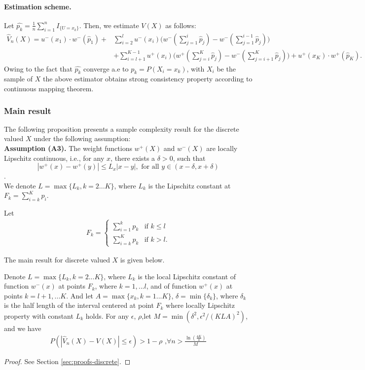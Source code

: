 \paragraph{Estimation scheme.} 
Let $\hat{p_k}= \frac{1}{n} \sum_{i=1}^n I_{\{U =x_k\}}$. Then, we estimate $V(X)$ as follows:
\begin{align}
 \label{eq:cpt-discrete-est}
\hat V_n(X) = 
u^-(x_1)\cdot w^-(\hat p_1)+
& \sum_{i=2}^l u^-(x_i) \Big(w^-(\sum_{j=1}^i \hat p_j) - w^-(\sum_{j=1}^{i-1} \hat p_j)\Big) 
\\
&
+ \sum_{i=l+1}^{K-1} u^+(x_i) \Big(w^+(\sum_{j=i}^K \hat p_j) - w^-(\sum_{j=i+1}^K \hat p_j) \Big)+ u^+(x_K)\cdot w^+(\hat p_K).
\end{align}
Owing to the fact that $\hat{p_k}$ converge a.e to $p_k=P(X_i=x_k)$, with $X_i$ be the sample of $X$ the above estimator obtains strong consistency property according to continuous mapping theorem. 


\subsubsection*{Main result}
The following proposition presents a sample complexity result for the discrete valued $X$ under the following assumption:\\
\textbf{Assumption (A3).}  The weight functions $w^+(X)$ and $w^-(X)$ are locally Lipschitz continuous, i.e., for any $x$, there exists a $\delta>0$, such that
$$| w^+(x) - w^+(y) | \leq L_x |x-y|, \text{ for all } y \in (x-\delta,x+\delta) $$.\\

We denote $L=\max\{L_k, k=2...K\}$,  where $L_k$ is the Lipschitz constant at $F_k = \sum_{i=k}^K p_i$.


Let 
\begin{align}
\label{eq:Fk}
F_k = 
\begin{cases}
   \sum_{i=1}^k p_k & \text{if   } k \leq l \\
   \sum_{i=k}^K p_k & \text{if  }  k > l.
\end{cases}  
\end{align}

The main result for discrete valued $X$ is given below.
\begin{proposition}
\label{prop:sample-complexity-discrete}
Denote $L=\max\{L_k, k=2...K\} $, where $L_k$ is the local Lipschitz constant of function $w^-(x)$ at points
$F_k$, where $k=1,...l$, and of function $w^+(x)$ at points $k=l+1,...K$. 
And let $A=\max\{x_k, k=1...K\}$, $\delta =\min\{\delta_k\}$, where $\delta_k$ is the half length of the interval centered at point $F_k$ where locally Lipschitz property with constant $L_k$ holds.
For any $\epsilon$, $\rho$,let $M=\min(\delta^2, \epsilon^2/(KLA)^2)$, and we have 
\begin{align}
P(\left|
\hat V_n(X) -V(X)
\right| \leq \epsilon) > 1-\rho \text{        ,} \forall n> \frac{\ln(\frac{4K}{a})} { M} 
\end{align}
\end{proposition}
\begin{proof}
 See Section \ref{sec:proofs-discrete}.
\end{proof}

